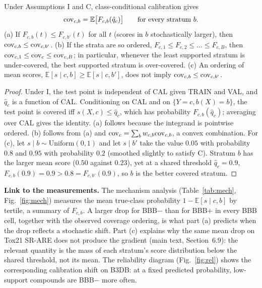 \documentclass[10pt]{article}
\begin{document}
\begin{proposition}\label{prop:S-shared}
Under Assumptions I and C, class-conditional calibration gives
\[\mathrm{cov}_{c,b}=\mathbb E\big[F_{c,b}(\hat q_c)\big]\qquad\text{for every stratum }b.\]
(a) If $F_{c,b}(t)\le F_{c,b'}(t)$ for all $t$ (scores in $b$ stochastically larger), then $\mathrm{cov}_{c,b}\le\mathrm{cov}_{c,b'}$.
(b) If the strata are so ordered, $F_{c,1}\le F_{c,2}\le\dots\le F_{c,B}$, then $\mathrm{cov}_{c,1}\le\mathrm{cov}_c\le\mathrm{cov}_{c,B}$; in particular, whenever the least supported stratum is under-covered, the best supported stratum is over-covered.
(c) An ordering of mean scores, $\mathbb E[s\mid c,b]\ge\mathbb E[s\mid c,b']$, does not imply $\mathrm{cov}_{c,b}\le\mathrm{cov}_{c,b'}$.
\end{proposition}
\begin{proof}
Under I, the test point is independent of CAL given TRAIN and VAL, and $\hat q_c$ is a function of CAL. Conditioning on CAL and on $\{Y=c,b(X)=b\}$, the test point is covered iff $s(X,c)\le\hat q_c$, which has probability $F_{c,b}(\hat q_c)$; averaging over CAL gives the identity. (a) follows because the integrand is pointwise ordered. (b) follows from (a) and $\mathrm{cov}_c=\sum_bw_{c,b}\mathrm{cov}_{c,b}$, a convex combination. For (c), let $s\mid b\sim\mathrm{Uniform}(0,1)$ and let $s\mid b'$ take the value $0.05$ with probability $0.8$ and $0.95$ with probability $0.2$ (smoothed slightly to satisfy C). Stratum $b$ has the larger mean score ($0.50$ against $0.23$), yet at a shared threshold $\hat q_c=0.9$, $F_{c,b}(0.9)=0.9>0.8=F_{c,b'}(0.9)$, so $b$ is the better covered stratum.
\end{proof}
\noindent\textbf{Link to the measurements.} The mechanism analysis (Table~\ref{tab:mech}, Fig.~\ref{fig:mech}) measures the mean true-class probability $1-\mathbb E[s\mid c,b]$ by tertile, a summary of $F_{c,b}$. A larger drop for BBB$-$ than for BBB$+$ in every BBB cell, together with the observed coverage ordering, is what part (a) predicts when the drop reflects a stochastic shift. Part (c) explains why the same mean drop on Tox21 SR-ARE does not produce the gradient (main text, Section~6.9): the relevant quantity is the mass of each stratum's score distribution below the shared threshold, not its mean. The reliability diagram (Fig.~\ref{fig:rel}) shows the corresponding calibration shift on B3DB: at a fixed predicted probability, low-support compounds are BBB$-$ more often.
\end{document}
